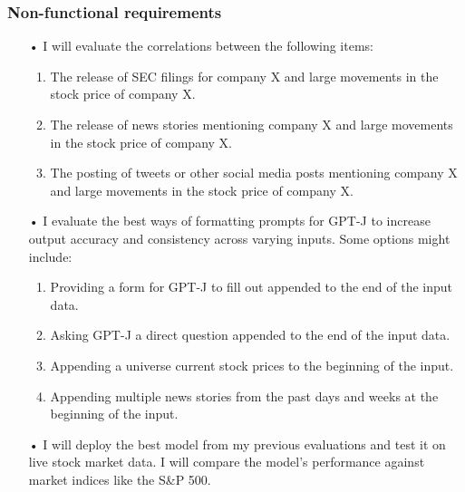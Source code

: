 \documentclass[conference]{IEEEtran}
\begin{document}
\subsubsection{Non-functional requirements}
\begin{enumerate}
    \item[•] I will evaluate the correlations between the following items:
    \begin{enumerate}
        \item The release of SEC filings for company X and large movements in the stock price of company X.
        \item The release of news stories mentioning company X and large movements in the stock price of company X.
        \item The posting of tweets or other social media posts mentioning company X and large movements in the stock price of company X.
    \end{enumerate}
    \item[•] I evaluate the best ways of formatting prompts for GPT-J to increase output accuracy and consistency across varying inputs. Some options might include:
    \begin{enumerate}
        \item Providing a form for GPT-J to fill out appended to the end of the input data.
        \item Asking GPT-J a direct question appended to the end of the input data.
        \item Appending a universe current stock prices to the beginning of the input.
        \item Appending multiple news stories from the past days and weeks at the beginning of the input.
    \end{enumerate}
    \item[•] I will deploy the best model from my previous evaluations and test it on live stock market data. I will compare the model's performance against market indices like the S\&P 500. 
\end{enumerate}
\end{document}
